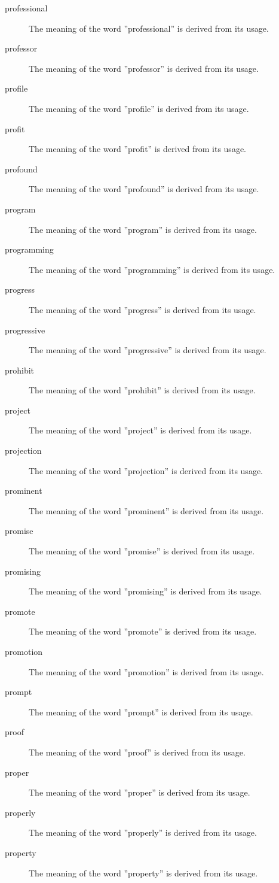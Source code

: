 \documentclass[12pt, letterpaper]{memoir}
\begin{document}
\begin{description}
\item[professional] The meaning of the word ''professional'' is derived from its usage.
\item[professor] The meaning of the word ''professor'' is derived from its usage.
\item[profile] The meaning of the word ''profile'' is derived from its usage.
\item[profit] The meaning of the word ''profit'' is derived from its usage.
\item[profound] The meaning of the word ''profound'' is derived from its usage.
\item[program] The meaning of the word ''program'' is derived from its usage.
\item[programming] The meaning of the word ''programming'' is derived from its usage.
\item[progress] The meaning of the word ''progress'' is derived from its usage.
\item[progressive] The meaning of the word ''progressive'' is derived from its usage.
\item[prohibit] The meaning of the word ''prohibit'' is derived from its usage.
\item[project] The meaning of the word ''project'' is derived from its usage.
\item[projection] The meaning of the word ''projection'' is derived from its usage.
\item[prominent] The meaning of the word ''prominent'' is derived from its usage.
\item[promise] The meaning of the word ''promise'' is derived from its usage.
\item[promising] The meaning of the word ''promising'' is derived from its usage.
\item[promote] The meaning of the word ''promote'' is derived from its usage.
\item[promotion] The meaning of the word ''promotion'' is derived from its usage.
\item[prompt] The meaning of the word ''prompt'' is derived from its usage.
\item[proof] The meaning of the word ''proof'' is derived from its usage.
\item[proper] The meaning of the word ''proper'' is derived from its usage.
\item[properly] The meaning of the word ''properly'' is derived from its usage.
\item[property] The meaning of the word ''property'' is derived from its usage.

\end{description}
\end{document}
